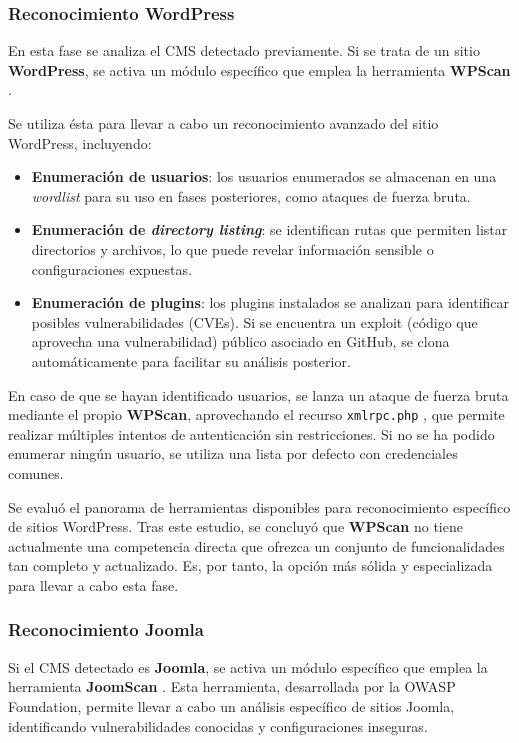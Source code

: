 \begin{parskipenv}
\subsubsection*{Reconocimiento WordPress}
En esta fase se analiza el CMS detectado previamente. Si se trata de un sitio \textbf{WordPress}, se activa un módulo específico que emplea la herramienta \textbf{WPScan} \cite{wpscan}.

Se utiliza ésta para llevar a cabo un reconocimiento avanzado del sitio WordPress, incluyendo:

\begin{itemize}
  \item \textbf{Enumeración de usuarios}: los usuarios enumerados se almacenan en una \textit{wordlist} para su uso en fases posteriores, como ataques de fuerza bruta.
  \item \textbf{Enumeración de \textit{directory listing}}: se identifican rutas que permiten listar directorios y archivos, lo que puede revelar información sensible o configuraciones expuestas.
  \item \textbf{Enumeración de plugins}: los plugins instalados se analizan para identificar posibles vulnerabilidades (CVEs). Si se encuentra un exploit (código que aprovecha una vulnerabilidad) público asociado en GitHub, se clona automáticamente para facilitar su análisis posterior.
\end{itemize}

En caso de que se hayan identificado usuarios, se lanza un ataque de fuerza bruta mediante el propio \textbf{WPScan}, aprovechando el recurso \texttt{xmlrpc.php} \cite{xmlrpc}, que permite realizar múltiples intentos de autenticación sin restricciones. Si no se ha podido enumerar ningún usuario, se utiliza una lista por defecto con credenciales comunes.

Se evaluó el panorama de herramientas disponibles para reconocimiento específico de sitios WordPress. Tras este estudio, se concluyó que \textbf{WPScan} no tiene actualmente una competencia directa que ofrezca un conjunto de funcionalidades tan completo y actualizado. Es, por tanto, la opción más sólida y especializada para llevar a cabo esta fase.

\subsubsection*{Reconocimiento Joomla}
Si el CMS detectado es \textbf{Joomla}, se activa un módulo específico que emplea la herramienta \textbf{JoomScan} \cite{joomscan}. Esta herramienta, desarrollada por la OWASP Foundation, permite llevar a cabo un análisis específico de sitios Joomla, identificando vulnerabilidades conocidas y configuraciones inseguras.


\end{parskipenv}
